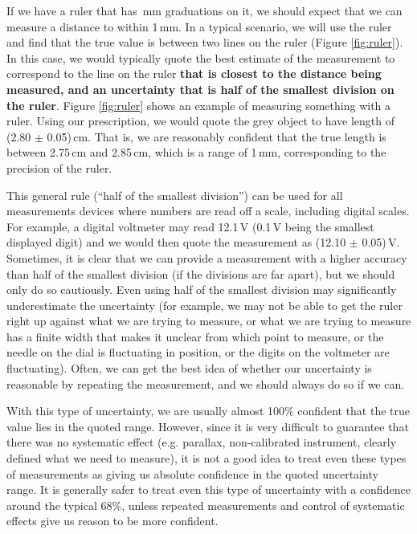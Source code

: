 If we have a ruler that has \,mm graduations on it, we should expect that we can measure a distance to within 1\,mm. In a typical scenario, we will use the ruler and find that the true value is between two lines on the ruler (Figure \ref{fig:ruler}). In this case, we would typically quote the best estimate of the measurement to correspond to the line on the ruler \textbf{that is closest to the distance being measured, and an uncertainty that is half of the smallest division on the ruler}. Figure \ref{fig:ruler} shows an example of measuring something with a ruler. Using our prescription, we would quote the grey object to have length of (2.80 $\pm$ 0.05)\,cm. That is, we are reasonably confident that the true length is between 2.75\,cm and 2.85\,cm, which is a range of 1\,mm, corresponding to the precision of the ruler. 


This general rule (``half of the smallest division'') can be used for all measurements devices where numbers are read off a scale, including digital scales. For example, a digital voltmeter may read 12.1\,V (0.1\,V being the smallest displayed digit) and we would then quote the measurement as (12.10 $\pm$ 0.05)\,V. Sometimes, it is clear that we can provide a measurement with a higher accuracy than half of the smallest division (if the divisions are far apart), but we should only do so cautiously. Even using half of the smallest division may significantly underestimate the uncertainty (for example, we may not be able to get the ruler right up against what we are trying to measure, or what we are trying to measure has a finite width that makes it unclear from which point to measure, or the needle on the dial is fluctuating in position, or the digits on the voltmeter are fluctuating). Often, we can get the best idea of whether our uncertainty is reasonable by repeating the measurement, and we should always do so if we can. 

With this type of uncertainty, we are usually almost 100\% confident that the true value lies in the quoted range. However, since it is very difficult to guarantee that there was no systematic effect (e.g. parallax, non-calibrated instrument, clearly defined what we need to measure), it is not a good idea to treat even these types of measurements as giving us absolute confidence in the quoted uncertainty range. It is generally safer to treat even this type of uncertainty with a confidence around the typical 68\%, unless repeated measurements and control of systematic effects give us reason to be more confident.

